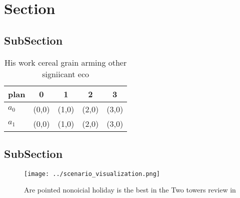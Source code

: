 \documentclass[a4paper]{article}
\begin{document}
\section{Section}

\subsection{SubSection}

\begin{table}
\begin{adjustbox}{width=0.7\columnwidth}
\begin{tabular}{|l|l|l|l|l|}
\hline
\textbf{plan} & \multicolumn{1}{c|}{\textbf{0}} & \multicolumn{1}{c|}{\textbf{1}} & \multicolumn{1}{c|}{\textbf{2}} & \multicolumn{1}{c|}{\textbf{3}} \\ \hline
\textbf{$a_0$}  & (0,0) & (1,0) & (2,0) & (3,0) \\ \hline
\textbf{$a_1$}  & (0,0) & (1,0) & (2,0) & (3,0) \\ \hline
\end{tabular}
\end{adjustbox}
\caption{His work cereal grain arming other signiicant eco
}
\end{table}

\subsection{SubSection}

\begin{figure}
\centering
\texttt{[image: ../scenario\_visualization.png]}
\caption{Are pointed nonoicial holiday is the best in the Two towers review in
}
\end{figure}
 
\end{document}
